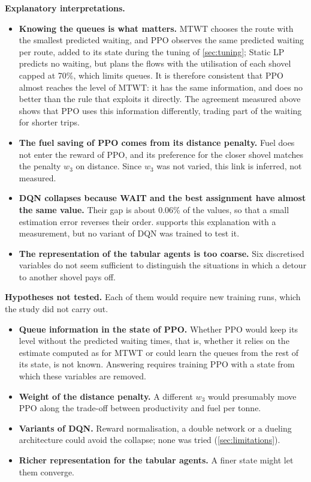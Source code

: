 \documentclass[11pt,a4paper]{article}
\newif\ifcorrmarks
\newenvironment{corrbloc}{\par\ifcorrmarks\color{corrcolor}\fi}{\par}
\begin{document}
\begin{corrbloc}
\textbf{Explanatory interpretations.}
\begin{itemize}
  \item \textbf{Knowing the queues is what matters.} MTWT chooses the route with the smallest predicted waiting, and PPO observes the same predicted waiting per route, added to its state during the tuning of \cref{sec:tuning}; Static LP predicts no waiting, but plans the flows with the utilisation of each shovel capped at 70\%, which limits queues. It is therefore consistent that PPO almost reaches the level of MTWT: it has the same information, and does no better than the rule that exploits it directly. The agreement measured above shows that PPO uses this information differently, trading part of the waiting for shorter trips.
  \item \textbf{The fuel saving of PPO comes from its distance penalty.} Fuel does not enter the reward of PPO, and its preference for the closer shovel matches the penalty $w_3$ on distance. Since $w_3$ was not varied, this link is inferred, not measured.
  \item \textbf{DQN collapses because WAIT and the best assignment have almost the same value.} Their gap is about 0.06\% of the values, so that a small estimation error reverses their order.  supports this explanation with a measurement, but no variant of DQN was trained to test it.
  \item \textbf{The representation of the tabular agents is too coarse.} Six discretised variables do not seem sufficient to distinguish the situations in which a detour to another shovel pays off.
\end{itemize}

\textbf{Hypotheses not tested.} Each of them would require new training runs, which the study did not carry out.
\begin{itemize}
  \item \textbf{Queue information in the state of PPO.} Whether PPO would keep its level without the predicted waiting times, that is, whether it relies on the estimate computed as for MTWT or could learn the queues from the rest of its state, is not known. Answering requires training PPO with a state from which these variables are removed.
  \item \textbf{Weight of the distance penalty.} A different $w_3$ would presumably move PPO along the trade-off between productivity and fuel per tonne.
  \item \textbf{Variants of DQN.} Reward normalisation, a double network or a dueling architecture could avoid the collapse; none was tried (\cref{sec:limitations}).
  \item \textbf{Richer representation for the tabular agents.} A finer state might let them converge.
\end{itemize}
\end{corrbloc}
\end{document}
